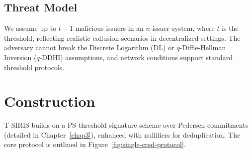 \subsection{Threat Model}

We assume up to $t-1$ malicious issuers in an $n$-issuer system, where $t$ is the threshold, reflecting realistic collusion scenarios in decentralized settings. The adversary cannot break the Discrete Logarithm (DL) or $q$-Diffie-Hellman Inversion ($q$-DDHI) assumptions, and network conditions support standard threshold protocols.

\section{Construction}
\label{sec:threshold-construction}

T-SIRIS builds on a PS threshold signature scheme over Pedersen commitments (detailed in Chapter~\ref{chap3}), enhanced with nullifiers for deduplication. The core protocol is outlined in Figure~\ref{fig:single-cred-protocol}.

